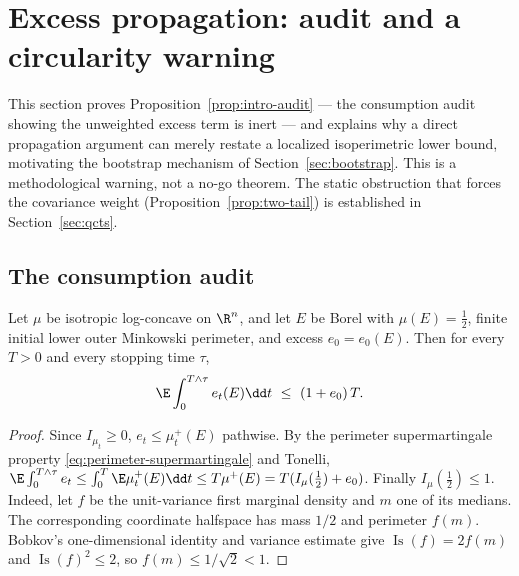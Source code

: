 \documentclass[../../main.tex]{subfiles}
\begin{document}
\section{Excess propagation: audit and a circularity warning}
\label{sec:excess}

This section proves Proposition~\ref{prop:intro-audit} --- the consumption audit showing the
unweighted excess term is inert --- and explains why a direct propagation argument can merely
restate a localized isoperimetric lower bound, motivating the bootstrap mechanism of
Section~\ref{sec:bootstrap}. This is a methodological warning, not a no-go theorem. The static obstruction that
forces the covariance weight (Proposition~\ref{prop:two-tail}) is established in
Section~\ref{sec:qcts}.

\subsection{The consumption audit}

\begin{proposition}
\label{prop:trivial-excess}
Let $\mu$ be isotropic log-concave on $\R^n$, and let $E$ be Borel with
$\mu(E)=\tfrac12$, finite initial lower outer Minkowski perimeter, and excess
$e_0=e_0(E)$. Then for every $T>0$ and every stopping time $\tau$,
\begin{equation}\label{eq:trivial-excess}
  \E\int_0^{T\wedge\tau}e_t(E)\dd t\ \le\ (1+e_0)\,T .
\end{equation}
\end{proposition}

\begin{proof}
Since $I_{\mu_t}\ge0$, $e_t\le\mu_t^+(E)$ pathwise. By the perimeter supermartingale property
\eqref{eq:perimeter-supermartingale} and Tonelli,
$\E\int_0^{T\wedge\tau}e_t\le\int_0^T\E\mu_t^+(E)\dd t\le T\mu^+(E)=T(I_\mu(\tfrac12)+e_0)$.
Finally $I_\mu(\tfrac12)\le1$. Indeed, let $f$ be the unit-variance first marginal density and
$m$ one of its medians. The corresponding coordinate halfspace has mass $1/2$ and perimeter
$f(m)$. Bobkov's one-dimensional identity and variance estimate
\cite[Proposition~4.1 and (4.2)]{Bobkov1999LogConcave} give
$\operatorname{Is}(f)=2f(m)$ and $\operatorname{Is}(f)^2\le2$, so
$f(m)\le1/\sqrt2<1$.
\end{proof}
\end{document}
